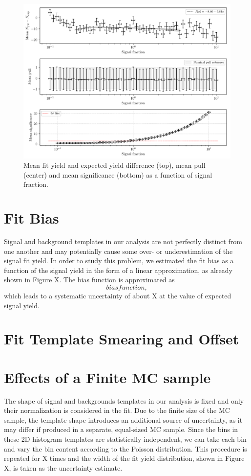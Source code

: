\begin{figure}[!htbp]
	\centering
	\captionsetup{width=0.8\linewidth}
	\includegraphics[width=\linewidth]{fig/lin_test}
	\caption{Mean fit yield and expected yield difference (top), mean pull (center) and mean significance (bottom) as a function of signal fraction.}
	\label{fig:lin_test}
\end{figure}



\section{Fit Bias}
Signal and background templates in our analysis are not perfectly distinct from one another and may potentially cause some over- or underestimation of the signal fit yield. In order to study this problem, we estimated the fit bias as a function of the signal yield in the form of a linear approximation, as already shown in Figure X. The bias function is approximated as
\begin{equation}
bias function,
\end{equation}
which leads to a systematic uncertainty of about X at the value of expected signal yield.


\section{Fit Template Smearing and Offset}


\section{Effects of a Finite MC sample}
The shape of signal and backgrounds templates in our analysis is fixed and only their normalization is considered in the fit. Due to the finite size of the MC sample, the template shape introduces an additional source of uncertainty, as it may differ if produced in a separate, equal-sized MC sample. Since the bins in these 2D histogram templates are statistically independent, we can take each bin and vary the bin content according to the Poisson distribution. This procedure is repeated for X times and the width of the fit yield distribution, shown in Figure X, is taken as the uncertainty estimate.

